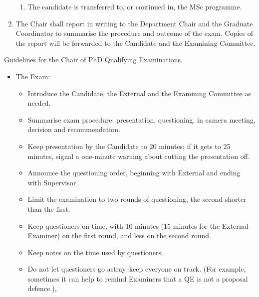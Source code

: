 \documentclass[12pt]{article}
\newcommand\qe{QE\xspace}
\newcommand\QE{PhD Qualifying Examination\xspace}
\newcommand{\parnum}{\arabic{parcount}}
\newcounter{parcount}
\newcommand\p{\stepcounter{parcount}\leavevmode{\raisebox{0.2ex}{\scriptsize[\parnum]}}\hspace{0.2em}}
\newcommand{\supervisor}{Supervisor\xspace}
\newcommand{\GC}{Graduate Coordinator\xspace}
\begin{document}
\begin{enumerate}
\begin{enumerate}
            \item The candidate is transferred to, or continued in, the MSc programme.

        \end{enumerate}

    \item The Chair shall report in writing to the Department Chair and the \GC
        to summarise the procedure and outcome of the exam.  Copies of the
        report will be forwarded to the Candidate and the Examining Committee.

\end{enumerate}

\p Guidelines for the Chair of {\QE}s.

\begin{itemize}

    \item The Exam:

        \begin{itemize}

            \item Introduce the Candidate, the External and the Examining
                Committee as needed.

            \item Summarise exam procedure: presentation, questioning, in
                camera meeting, decision and recommendation.

            \item Keep presentation by the Candidate to 20 minutes; if it gets
                to 25 minutes, signal a one-minute warning about cutting
                the presentation off.

            \item Announce the questioning order, beginning with External and
                ending with \supervisor.

            \item Limit the examination to two rounds of questioning, the
                second shorter than the first.

            \item Keep questioners on time, with 10 minutes (15 minutes for the
                External Examiner) on the first round, and less on the second
                round.

            \item Keep notes on the time used by questioners.

            \item Do not let questioners go astray--keep everyone on track.
                (For example, sometimes it can help to remind Examiners that a
                \qe is not a proposal defence.),


\end{itemize}
\end{itemize}
\end{document}

